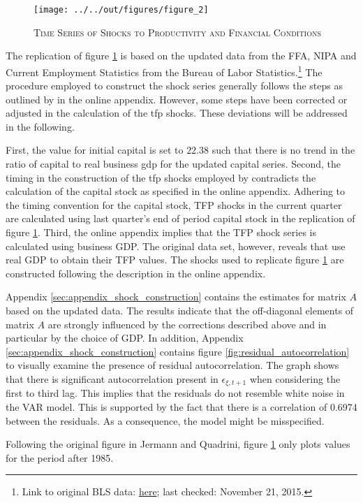 \begin{figure}[ht]
    
    \centering

    \texttt{[image: ../../out/figures/figure\_2]}

    \caption{\textsc{Time Series of Shocks to Productivity and Financial Conditions}}
    
    \label{fig:figure_2}

\end{figure}

The replication of figure \ref{fig:figure_2} is based on the updated data from the FFA, NIPA and Current Employment Statistics from the Bureau of Labor Statistics.\footnote{Link to original BLS data: \href{https://research.stlouisfed.org/fred2/series/AWHI/downloaddata}{here}; last checked: November 21, 2015.} 
The procedure employed to construct the shock series generally follows the steps as outlined by \citeauthor{JERMANNfinancial} in the online appendix. However, some steps have been corrected or adjusted in the calculation of the tfp shocks. These deviations will be addressed in the following. 

First, the value for initial capital is set to $22.38$ such that there is no trend in the ratio of capital to real business gdp for the updated capital series. Second, the timing in the construction of the tfp shocks employed by \citeauthor{JERMANNfinancial} contradicts the calculation of the capital stock as specified in the online appendix. Adhering to the timing convention for the capital stock, TFP shocks in the current quarter are calculated using last quarter's end of period capital stock in the replication of figure \ref{fig:figure_2}. 
Third, the online appendix implies that the TFP shock series is calculated using business GDP. The original data set, however, reveals that \citeauthor{JERMANNfinancial} use real GDP to obtain their TFP values. The shocks used to replicate figure \ref{fig:figure_2} are constructed following the description in the online appendix. 

Appendix \ref{sec:appendix_shock_construction} contains the estimates for matrix $A$ based on the updated data. The results indicate that the off-diagonal elements of matrix $A$ are strongly influenced by the corrections described above and in particular by the choice of GDP. 
In addition, Appendix \ref{sec:appendix_shock_construction} contains figure \ref{fig:residual_autocorrelation} to visually examine the presence of residual autocorrelation.
The graph shows that there is significant autocorrelation present in ${\epsilon}_{\xi,t+1}$ when considering the first to third lag. This implies that the residuals do not resemble white noise in the VAR model. This is supported by the fact that there is a correlation of 0.6974 between the residuals. As a consequence, the model might be misspecified.

Following the original figure in Jermann and Quadrini, figure \ref{fig:figure_2} only plots values for the period after 1985.
